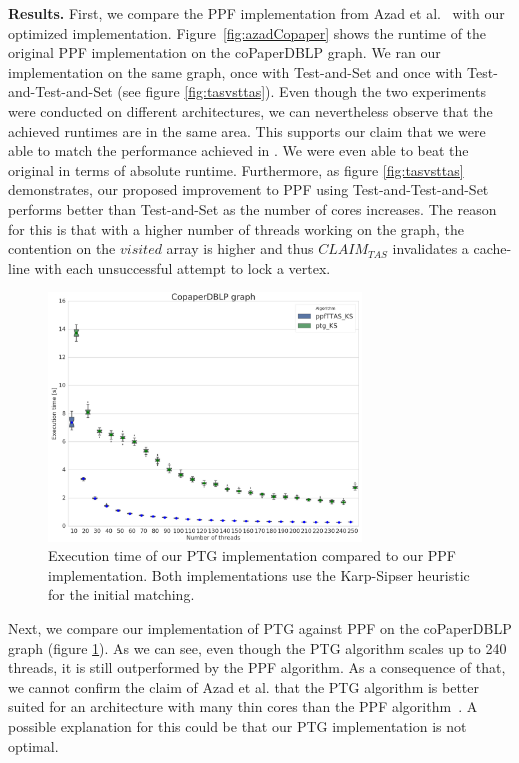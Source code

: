 \documentclass[letterpaper]{article}
\newcommand{\mypar}[1]{{\bf #1.}}
\begin{document}
\mypar{Results} First, we compare the PPF implementation from Azad et al.~\cite{Azad:2012} with our optimized implementation. 
Figure~\ref{fig:azadCopaper} shows the runtime of the original PPF implementation on the coPaperDBLP graph. 
We ran our implementation on the same graph, once with Test-and-Set and once with Test-and-Test-and-Set (see figure \ref{fig:tasvsttas}). 
Even though the two experiments were conducted on different architectures, we can nevertheless observe that the achieved runtimes are in the same area. 
This supports our claim that we were able to match the performance achieved in \cite{Azad:2012}. 
We were even able to beat the original in terms of absolute runtime.
Furthermore, as figure \ref{fig:tasvsttas} demonstrates, our proposed improvement to PPF using Test-and-Test-and-Set performs 
better than Test-and-Set as the number of cores increases. The reason for this is that with a higher number of threads working on the graph, 
the contention on the $visited$ array is higher and thus \texttt{$CLAIM_{TAS}$} invalidates a cache-line with each unsuccessful attempt to lock a vertex.\\
 
\begin{figure}\centering
	\includegraphics[width=8.3cm]{../../plot/output/report/coPaperDBLP_TGvsPPFTTAS.png}
	\caption{Execution time of our PTG implementation compared to our PPF implementation. Both implementations use the Karp-Sipser heuristic for the initial matching.}
	\label{fig:tgvsppf}
\end{figure}

Next, we compare our implementation of PTG against PPF on the coPaperDBLP graph (figure \ref{fig:tgvsppf}). As we can see, even though the PTG algorithm scales up to 240 threads, it is still outperformed by the PPF algorithm. As a consequence of that, we cannot confirm the claim of Azad et al. that the PTG algorithm is better suited for an architecture with many thin cores than the PPF algorithm~\cite{Azad:2015}. A possible explanation for this could be that our PTG implementation is not optimal.\\
\end{document}
